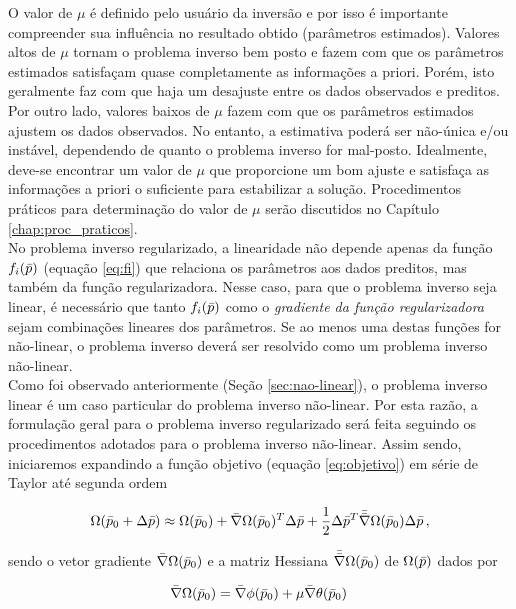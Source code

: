 \noindent O valor de $\mu$ é definido pelo usuário da inversão e por isso é
importante compreender sua influência no resultado obtido (parâmetros estimados).
Valores altos de $\mu$ tornam o problema inverso bem posto e fazem com que os
parâmetros estimados satisfaçam quase completamente as informações a priori.
Porém, isto geralmente faz com que haja um desajuste entre os dados observados e
preditos.
Por outro lado, valores baixos de $\mu$ fazem com que os parâmetros estimados
ajustem os dados observados. No entanto, a estimativa poderá ser não-única e/ou
instável, dependendo de quanto o problema inverso for mal-posto.
Idealmente, deve-se encontrar um valor de $\mu$ que proporcione um bom ajuste e
satisfaça as informações a priori o suficiente para estabilizar a solução.
Procedimentos práticos para determinação do valor de $\mu$ serão discutidos no
Capítulo \ref{chap:proc_praticos}.
\\
\indent No problema inverso regularizado, a linearidade não depende apenas da
função $f_i(\bar{p})$ (equação \ref{eq:fi}) que relaciona os parâmetros aos
dados preditos, mas também da função regularizadora.
Nesse caso, para que o problema inverso seja linear, é necessário que tanto
$f_i(\bar{p})$ como o {\it gradiente da função regularizadora} sejam
combinações lineares dos parâmetros.
Se ao menos uma destas funções for não-linear, o problema inverso deverá ser
resolvido como um problema inverso não-linear.
\\
\indent Como foi observado anteriormente (Seção \ref{sec:nao-linear}), o
problema inverso linear é um caso particular do problema inverso não-linear.
Por esta razão, a formulação geral para o problema inverso regularizado
será feita seguindo os procedimentos adotados para o problema inverso não-linear.
Assim sendo, iniciaremos expandindo a função objetivo (equação
\ref{eq:objetivo}) em série de Taylor até segunda ordem

\begin{equation}
\Omega(\bar{p}_0 + \Delta\bar{p}) \approx \Omega(\bar{p}_0) +
    \bar{\nabla}\Omega(\bar{p}_0)^T\Delta\bar{p} +
    \frac{1}{2}\Delta\bar{p}^T\bar{\bar{\nabla}}\Omega(\bar{p}_0)\Delta\bar{p}
    \thinspace ,
\label{eq:objetivo_taylor}
\end{equation}

\noindent sendo o vetor gradiente $\bar{\nabla}\Omega(\bar{p}_0)$ e a matriz
Hessiana $\bar{\bar{\nabla}}\Omega(\bar{p}_0)$ de $\Omega(\bar{p})$ dados por

\begin{equation}
\bar{\nabla}\Omega(\bar{p}_0) = \bar{\nabla}\phi(\bar{p}_0) +
    \mu\bar{\nabla}\theta(\bar{p}_0) \thinspace
\label{eq:grad_objetivo}
\end{equation}

